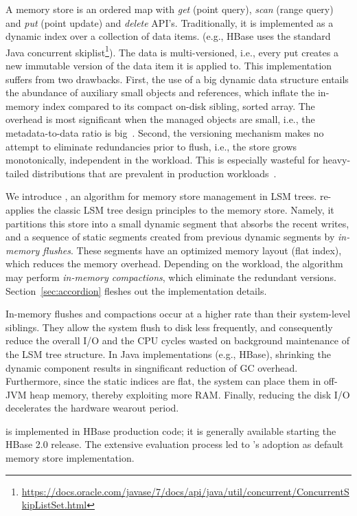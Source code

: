 A memory store is an ordered map with {\em get} (point query), {\em scan} (range query) and {\em put} 
(point update) and {\em delete} API's. Traditionally, it is implemented as a dynamic index over a collection of data items. 
(e.g., HBase uses the standard Java concurrent skiplist\footnote{\small{\url{https://docs.oracle.com/javase/7/docs/api/java/util/concurrent/ConcurrentSkipListSet.html}}}).
The data is multi-versioned, i.e., every put creates a new immutable version of the data item it is applied to. 
This implementation suffers from two drawbacks. First, the use of a big dynamic data structure entails 
the abundance of auxiliary small objects and references, which inflate the in-memory index compared 
to its compact on-disk sibling, sorted array. The overhead is most significant when the managed objects
are small, i.e., the metadata-to-data ratio is big~\cite{Wu2015}. Second, the versioning mechanism makes 
no attempt to eliminate redundancies prior to flush, i.e., the store grows monotonically, independent in the workload. 
This is especially wasteful for heavy-tailed distributions that are prevalent in production workloads~\cite{Devineni:2015}.

We introduce \sys, an algorithm for memory store management in LSM trees. %
\sys\/ re-applies the classic LSM tree design principles to the memory store. Namely, it partitions this store
 into a small dynamic segment that absorbs the recent writes, and a sequence of static segments created 
 from previous dynamic segments by {\em in-memory flushes}. These segments have an optimized memory
 layout (flat index), which reduces the memory overhead. Depending on the workload, the algorithm may 
 perform {\em in-memory compactions}, which eliminate the redundant versions. Section~\ref{sec:accordion}
 fleshes out the implementation details. 
 
 In-memory flushes and compactions occur at a higher rate than their system-level siblings. They allow the system 
 flush to disk less frequently, and consequently reduce the overall I/O and the CPU cycles wasted on background maintenance
  of the LSM tree structure. In Java implementations (e.g., HBase), shrinking 
 the dynamic component results in singnificant reduction of GC overhead. Furthermore, since the static indices 
 are flat, the system can place them in off-JVM heap memory, thereby exploiting more RAM. Finally, reducing the 
 disk I/O decelerates the hardware wearout period. 

\sys\/ is implemented in HBase production code; it is generally available starting the HBase 2.0 release. 
The extensive evaluation process led to \sys's adoption as default memory store implementation. 

